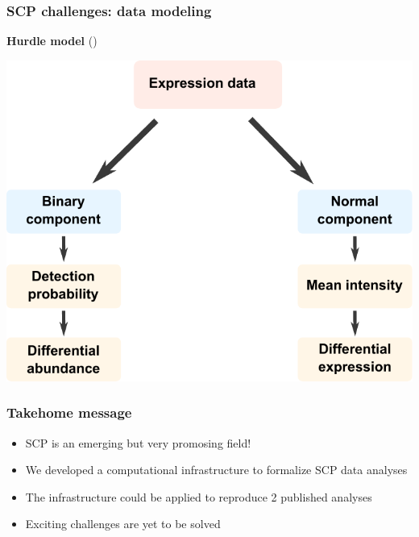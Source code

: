 \documentclass{beamer}
\begin{document}
\begin{frame}
  \frametitle{SCP challenges: data modeling}
  
  \textbf{Hurdle model} {\scriptsize (\cite{Goeminne2020-op})}
  
  \vfill
  \centering
  \includegraphics[width=0.7\linewidth]{figs/hurdle.pdf}
  
\end{frame}

\begin{frame}
  \frametitle{Takehome message}
  
  \begin{itemize}
    \item SCP is an emerging but very promosing field!
    \item We developed a computational infrastructure to formalize SCP
      data analyses
    \item The infrastructure could be applied to reproduce 2 published 
      analyses
    \item Exciting challenges are yet to be solved
  \end{itemize}
  
\end{frame}
\end{document}
